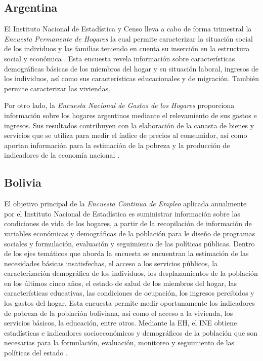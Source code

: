 \documentclass[
  12pt,
]{book}
\begin{document}
\hypertarget{argentina}{%
\subsection{Argentina}\label{argentina}}

El Instituto Nacional de Estadística y Censo lleva a cabo de forma trimestral la \emph{Encuesta Permanente de Hogares} la cual permite caracterizar la situación social de los individuos y las familias teniendo en cuenta su inserción en la estructura social y económica \citep{INDEC-AR}. Esta encuesta revela información sobre características demográficas básicas de los miembros del hogar y su situación laboral, ingresos de los individuos, así como sus características educacionales y de migración. También permite caracterizar las viviendas.

Por otro lado, la \emph{Encuesta Nacional de Gastos de los Hogares} proporciona información sobre los hogares argentinos mediante el relevamiento de sus gastos e ingresos. Sus resultados contribuyen con la elaboración de la canasta de bienes y servicios que se utiliza para medir el índice de precios al consumidor, así como aportan información para la estimación de la pobreza y la producción de indicadores de la economía nacional \citep{INDEC-AR2}.

\hypertarget{bolivia}{%
\subsection{Bolivia}\label{bolivia}}

El objetivo principal de la \emph{Encuesta Continua de Empleo} aplicada anualmente por el Instituto Nacional de Estadística es suministrar información sobre las condiciones de vida de los hogares, a partir de la recopilación de información de variables económicas y demográficas de la población para le diseño de programas sociales y formulación, evaluación y seguimiento de las políticas públicas. Dentro de los ejes temáticos que aborda la encuesta se encuentran la estimación de las necesidades básicas insatisfechas, el acceso a los servicios públicos, la caracterización demográfica de los individuos, los desplazamientos de la población en los últimos cinco años, el estado de salud de los miembros del hogar, las características educativas, las condiciones de ocupación, los ingresos percibidos y los gastos del hogar. Esta encuesta permite medir oportunamente los indicadores de pobreza de la población boliviana, así como el acceso a la vivienda, los servicios básicos, la educación, entre otros. Mediante la EH, el INE obtiene estadísticas e indicadores socioeconómicos y demográficos de la población que son necesarias para la formulación, evaluación, monitoreo y seguimiento de las políticas del estado \citep{INE-BO}.
\end{document}
